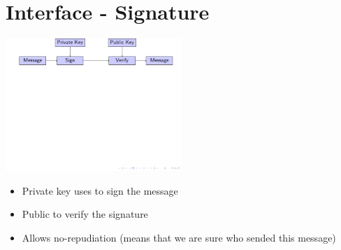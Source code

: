 \section{Interface - Signature}

\begin{frame}

\includegraphics[trim=0.5cm 4cm 14cm 0cm, height=5cm]{figures/signature.pdf}

\begin{itemize}
  \item Private key uses to sign the message
  \item Public to verify the signature
  \item Allows no-repudiation (means that we are sure who sended this message)
\end{itemize}



\end{frame}
